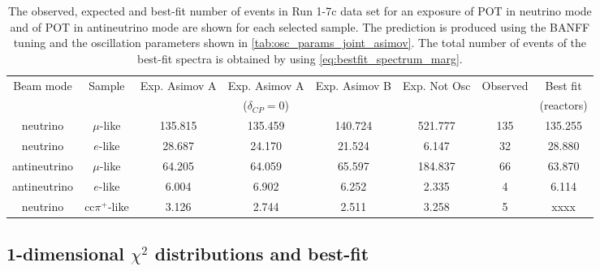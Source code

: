 \begin{table}[htb]
\centering
\begin{tabular}{| c | c | c | c | c | c | c | c |}
\hline
Beam mode	& Sample		& Exp. Asimov A  	& Exp. Asimov A	& Exp. Asimov B	& Exp. Not Osc			& Observed 	& Best fit\\
			& 			& 			  	& ($\delta_{CP}=0$)	& 				& 					& 		 	& (reactors) \\
\hline
neutrino	 	& $\mu$-like 	&135.815			& 135.459			& 140.724	 		& 521.777				& 135 		& 135.255 \\
neutrino 		& $e$-like  	& 28.687 			& 24.170			& 21.524			& 6.147				& 32 			& 28.880 \\
antineutrino 	& $\mu$-like 	& 64.205			& 64.059			& 65.597			& 184.837				& 66 			& 63.870 \\
antineutrino 	& $e$-like 	& 6.004			& 6.902			& 6.252			& 2.335				& 4 			& 6.114 \\
neutrino 		& cc$\pi^+$-like & 3.126 			& 2.744			& 2.511			& 3.258				& 5 			& xxxx \\

\hline
\end{tabular}
\caption{
The observed, expected and best-fit number of events in Run 1-7c data set
for an exposure
of \TotalPotNuRunOneSevenC POT in neutrino mode
and
of \TotalPotNuBarRunOneSevenC POT in antineutrino mode
are shown 
for each selected sample.
The prediction is produced using the BANFF tuning
and the oscillation parameters shown in \cref{tab:osc_params_joint_asimov}.
The total number of events of the best-fit spectra is obtained by using \cref{eq:bestfit_spectrum_marg}.
}
\label{tab:num_events_run17c}
\end{table}













%
%

\subsection {1-dimensional $\chi^2$ distributions and best-fit}
\label{sec:chisq_1d_run17c}



